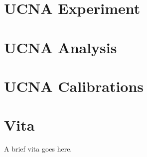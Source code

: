 \documentclass[final]{ukthesis}
\begin{document}
\tableofcontents\clearpage
\listoffigures\clearpage
\listoftables\clearpage


\mainmatter
\OnehalfSpacing


\copyrightnotice

\chapter{UCNA Experiment}
%
\copyrightnotice

\chapter{UCNA Analysis}
%
\copyrightnotice

\chapter{UCNA Calibrations}
%
\copyrightnotice


\copyrightnotice


\copyrightnotice


\backmatter

\printbibliography[title={References}]
%
%

\chapter{Vita}
A brief vita goes here.
\end{document}
